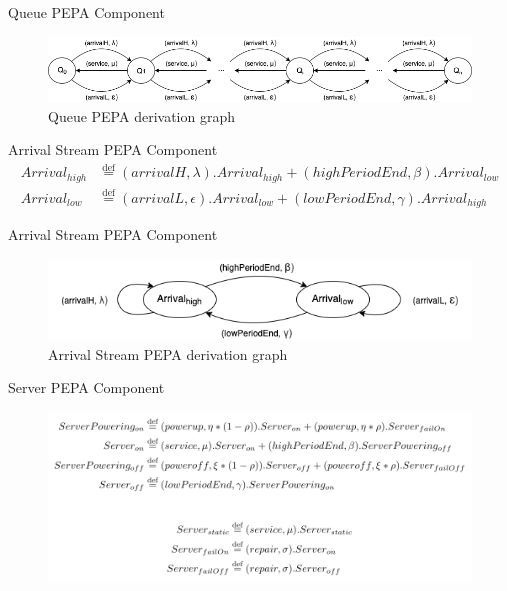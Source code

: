 \documentclass[8pt]{beamer}
\newcommand*{\defeq}{\stackrel{\text{def}}{=}}
\begin{document}
    \begin{frame}{Queue PEPA Component}
        \begin{figure}[H]
            \centering
            \includegraphics[width=1.0\textwidth]{Images/queue-derivation-graph.png}
            \caption{Queue PEPA derivation graph}
            \label{fig:queue-derivation-graph}
        \end{figure}
    \end{frame}
    
    \begin{frame}{Arrival Stream PEPA Component}
        \begin{align*} 
            Arrival_{high} &\defeq (arrivalH, \lambda).Arrival_{high} + (highPeriodEnd, \beta). Arrival_{low} \\
            Arrival_{low} &\defeq (arrivalL, \epsilon).Arrival_{low} + (lowPeriodEnd, \gamma). Arrival_{high}
        \end{align*} 
    \end{frame}

    \begin{frame}{Arrival Stream PEPA Component}
        \begin{figure}[H]
            \centering
            \includegraphics[width=1.0\textwidth]{Images/arrival-stream-derivation-graph.png}
            \caption{Arrival Stream PEPA derivation graph}
            \label{fig:arrival-stream-derivation-graph}
        \end{figure}
    \end{frame}

    \begin{frame}{Server PEPA Component}
        \begin{figure}[h]
            \centering
            \includegraphics[width=1.0\textwidth]{Images/server-equation.png}
            \label{fig:server-equation}
        \end{figure}
    \end{frame}
    
\end{document}
